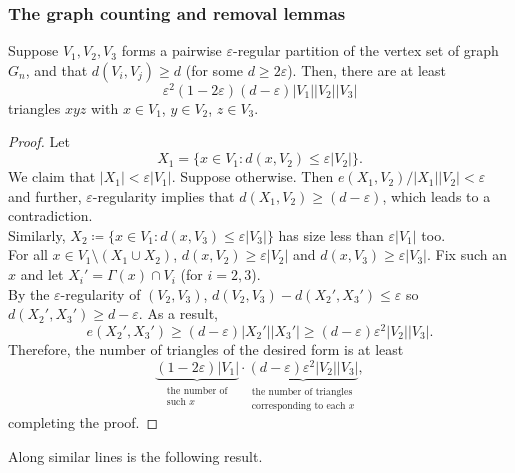 		\subsubsection{The graph counting and removal lemmas}

			\begin{ftheo}
				\label{theo: triangle counting lemma}
				Suppose $V_1,V_2,V_3$ forms a pairwise $\varepsilon$-regular partition of the vertex set of graph $G_n$, and that $d(V_i,V_j) \ge d$ (for some $d\ge 2\varepsilon$). Then, there are at least 
				\[ \varepsilon^2(1-2\varepsilon)(d-\varepsilon)|V_1||V_2||V_3| \]
				triangles $xyz$ with $x\in V_1$, $y\in V_2$, $z\in V_3$. 
			\end{ftheo}
			\begin{proof}
				Let
				\[ X_1 = \{x\in V_1 : d(x,V_2) \le \varepsilon |V_2|\}. \]
				We claim that $|X_1| < \varepsilon|V_1|$. Suppose otherwise. Then $e(X_1,V_2) / |X_1||V_2| < \varepsilon$ and further, $\varepsilon$-regularity implies that $d(X_1,V_2) \ge (d-\varepsilon)$, which leads to a contradiction.\\
				Similarly, $X_2 \coloneqq \{x\in V_1 : d(x,V_3) \le \varepsilon|V_3|\}$ has size less than $\varepsilon|V_1|$ too.\\
				For all $x\in V_1 \setminus (X_1 \cup X_2)$, $d(x,V_2) \ge \varepsilon|V_2|$ and $d(x,V_3) \ge \varepsilon|V_3|$. Fix such an $x$ and let $X_i' = \Gamma(x)\cap V_i$ (for $i=2,3$).\\
				By the $\varepsilon$-regularity of $(V_2,V_3)$, $d(V_2,V_3) - d(X_2',X_3') \le \varepsilon$ so $d(X_2',X_3') \ge d-\varepsilon$. As a result,
				\[ e(X_2',X_3') \ge (d-\varepsilon)|X_2'||X_3'| \ge (d-\varepsilon)\varepsilon^2|V_2||V_3|. \]
				Therefore, the number of triangles of the desired form is at least
				\[ \underbrace{(1-2\varepsilon)|V_1|}_{\substack{\text{the number of} \\ \text{such $x$}}}\cdot \underbrace{(d-\varepsilon)\varepsilon^2|V_2||V_3|}_{\substack{\text{the number of triangles} \\ \text{corresponding to each $x$}}}, \]
				completing the proof.
			\end{proof}

			Along similar lines is the following result.

